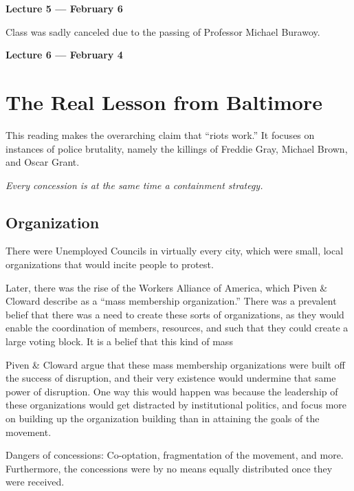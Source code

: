 
\vspace{3mm}
\noindent \textbf{Lecture 5 --- February 6\th}

Class was sadly canceled due to the passing of Professor Michael Burawoy.

\vspace{3mm}
\noindent \textbf{Lecture 6 --- February 4\th}

\section{The Real Lesson from Baltimore}
This reading makes the overarching claim that ``riots work.''
It focuses on instances of police brutality, namely the killings of Freddie Gray, Michael Brown, and Oscar Grant.

\begin{center}
    \textit{Every concession is at the same time a containment strategy.}
\end{center}

\subsection{Organization}
There were Unemployed Councils in virtually every city, which were small, local organizations that would incite people to protest.

Later, there was the rise of the Workers Alliance of America, which Piven \& Cloward describe as a ``mass membership organization.''
There was a prevalent belief that there was a need to create these sorts of organizations, as they would enable the coordination of members, resources, and such that they could create a large voting block.
It is a belief that this kind of mass

Piven \& Cloward argue that these mass membership organizations were built off the success of disruption, and their very existence would undermine that same power of disruption.
One way this would happen was because the leadership of these organizations would get distracted by institutional politics, and focus more on building up the organization building than in attaining the goals of the movement.

Dangers of concessions:
Co-optation, fragmentation of the movement, and more.
Furthermore, the concessions were by no means equally distributed once they were received.